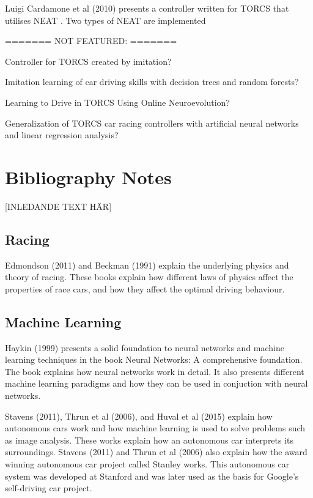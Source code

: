 Luigi Cardamone et al (2010) presents a controller written for TORCS that utilises NEAT \cite{cardamone2010learning}. Two types of NEAT are implemented 



======= NOT FEATURED: =======

Controller for TORCS created by imitation?

Imitation learning of car driving skills with decision trees and random forests?

Learning to Drive in TORCS Using Online Neuroevolution?

Generalization of TORCS car racing controllers with artificial neural networks and linear regression analysis?



\section{Bibliography Notes}
[INLEDANDE TEXT HÄR]

\subsection{Racing}

Edmondson (2011) and Beckman (1991) explain the underlying physics and theory of racing. These books explain how different laws of physics affect the properties of race cars, and how they affect the optimal driving behaviour. 


\subsection{Machine Learning}

Haykin (1999) presents a solid foundation to neural networks and machine learning techniques in the book Neural Networks: A comprehensive foundation.
The book explains how neural networks work in detail. It also presents different machine learning paradigms and how they can be used in conjuction with neural networks. 

Stavens (2011), Thrun et al (2006), and Huval et al (2015) explain how autonomous cars work and how machine learning is used to solve problems such as image analysis. These works explain how an autonomous car interprets its surroundings. Stavens (2011) and Thrun et al (2006) also explain how the award winning autonomous car project called Stanley works. This autonomous car system was developed at Stanford and was later used as the basis for Google's self-driving car project.






